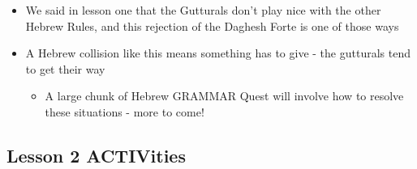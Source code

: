 \documentclass[
]{turabian-researchpaper}
\providecommand{\tightlist}{%
  \setlength{\itemsep}{0pt}\setlength{\parskip}{0pt}}
\begin{document}
\begin{itemize}
\tightlist
\item
  We said in lesson one that the Gutturals don't play nice with the other Hebrew Rules, and this rejection of the Daghesh Forte is one of those ways
\item
  A Hebrew collision like this means something has to give - the gutturals tend to get their way

  \begin{itemize}
  \tightlist
  \item
    A large chunk of Hebrew GRAMMAR Quest will involve how to resolve these situations - more to come!
  \end{itemize}
\end{itemize}

\hypertarget{two_8}{%
\subsection{Lesson 2 ACTIVities}\label{two_8}}
\end{document}
